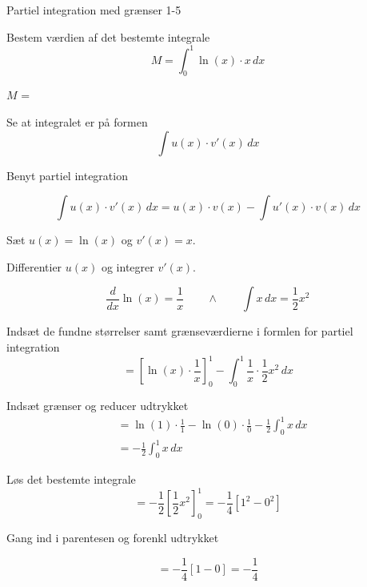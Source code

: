 \documentclass{article}
\begin{document}
\begin{exercise}{Partiel integration med grænser 1-5}
	
	
	Bestem værdien af det bestemte integrale
	\[
	M = \int_0^1 \ln(x) \cdot x \, dx
	\]
	
	$M$ =  \\
	
	
	\hint
	
	Se at integralet er på formen
	\[
	\int u(x) \cdot v'(x) \, dx
	\]
	
	\hint
	
	Benyt partiel integration
	
	\hint
	\[
	\int u(x) \cdot v'(x)\, dx = u(x) \cdot v(x) - \int u'(x) \cdot v(x) \, dx
	\]
	\hint
	
	Sæt $u(x) = \ln(x)$ og $v'(x) = x$.
	
	
	\hint
	
	Differentier $u(x)$ og integrer $v'(x)$.
	
	\hint
	\[
	\frac{d}{dx} \ln(x) = \frac{1}{x}  \qquad \wedge \qquad \int x \, dx = \frac{1}{2} x^2
	\]
	
	\hint
	
	Indsæt de fundne størrelser samt grænseværdierne i formlen for partiel integration 
	\[
	= \left[\ln(x) \cdot \frac{1}{x}\right]_{0}^{1} - \int_{0}^{1} \frac{1}{x} \cdot \frac{1}{2}x^2 \, dx
	\]
	
	\hint
	
	Indsæt grænser og reducer udtrykket
	\begin{align*}
	&= \ln(1) \cdot \frac{1}{1}  - \ln(0) \cdot \frac{1}{0}  -  \frac{1}{2} \int_{0}^{1} x  \, dx \\
	&= -  \frac{1}{2} \int_{0}^{1} x  \, dx 
	\end{align*}
	
	\hint
	Løs det bestemte integrale
	\[
	=  - \frac{1}{2} \left[ \frac{1}{2}x^2  \right]_{0}^{1} = - \frac{1}{4} \left[ 1^2 - 0^2 \right]
	\]
	
	\hint
	Gang ind i parentesen og forenkl udtrykket
	
	\hint
	\[
	= - \frac{1}{4} \left[ 1 - 0\right] = -\frac{1}{4}
	\]
	
	
	
\end{exercise}

\newpage
\end{document}

